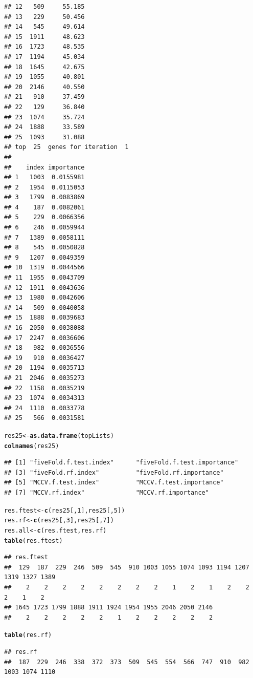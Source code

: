 \documentclass{article}\usepackage[]{graphicx}\usepackage[]{color}
\makeatletter
\newcommand{\hlnum}[1]{\textcolor[rgb]{0.686,0.059,0.569}{#1}}%
\newcommand{\hlstd}[1]{\textcolor[rgb]{0.345,0.345,0.345}{#1}}%
\newcommand{\hlkwb}[1]{\textcolor[rgb]{0.69,0.353,0.396}{#1}}%
\newcommand{\hlkwd}[1]{\textcolor[rgb]{0.737,0.353,0.396}{\textbf{#1}}}%
\newenvironment{kframe}{%
 \def\at@end@of@kframe{}%
 \ifinner\ifhmode%
  \def\at@end@of@kframe{\end{minipage}}%
  \begin{minipage}{\columnwidth}%
 \fi\fi%
 \def\FrameCommand##1{\hskip\@totalleftmargin \hskip-\fboxsep
 \colorbox{shadecolor}{##1}\hskip-\fboxsep
     \hskip-\linewidth \hskip-\@totalleftmargin \hskip\columnwidth}%
 \MakeFramed {\advance\hsize-\width
   \@totalleftmargin\z@ \linewidth\hsize
   \@setminipage}}%
 {\par\unskip\endMakeFramed%
 \at@end@of@kframe}
\newenvironment{knitrout}{}{} %
\makeatother
\begin{document}
\begin{knitrout}
\begin{kframe}
\begin{verbatim}
## 12   509     55.185
## 13   229     50.456
## 14   545     49.614
## 15  1911     48.623
## 16  1723     48.535
## 17  1194     45.034
## 18  1645     42.675
## 19  1055     40.801
## 20  2146     40.550
## 21   910     37.459
## 22   129     36.840
## 23  1074     35.724
## 24  1888     33.589
## 25  1093     31.088
## top  25  genes for iteration  1 
##  
##    index importance
## 1   1003  0.0155981
## 2   1954  0.0115053
## 3   1799  0.0083869
## 4    187  0.0082061
## 5    229  0.0066356
## 6    246  0.0059944
## 7   1389  0.0058111
## 8    545  0.0050828
## 9   1207  0.0049359
## 10  1319  0.0044566
## 11  1955  0.0043709
## 12  1911  0.0043636
## 13  1980  0.0042606
## 14   509  0.0040058
## 15  1888  0.0039683
## 16  2050  0.0038088
## 17  2247  0.0036606
## 18   982  0.0036556
## 19   910  0.0036427
## 20  1194  0.0035713
## 21  2046  0.0035273
## 22  1158  0.0035219
## 23  1074  0.0034313
## 24  1110  0.0033778
## 25   566  0.0031581
\end{verbatim}
\begin{alltt}
\hlstd{res25}\hlkwb{<-} \hlkwd{as.data.frame}\hlstd{(topLists)}
\hlkwd{colnames}\hlstd{(res25)}
\end{alltt}
\begin{verbatim}
## [1] "fiveFold.f.test.index"      "fiveFold.f.test.importance"
## [3] "fiveFold.rf.index"          "fiveFold.rf.importance"    
## [5] "MCCV.f.test.index"          "MCCV.f.test.importance"    
## [7] "MCCV.rf.index"              "MCCV.rf.importance"
\end{verbatim}
\begin{alltt}
\hlstd{res.ftest} \hlkwb{<-} \hlkwd{c}\hlstd{(res25[,}\hlnum{1}\hlstd{], res25[,}\hlnum{5}\hlstd{])}
\hlstd{res.rf} \hlkwb{<-}  \hlkwd{c}\hlstd{(res25[,}\hlnum{3}\hlstd{], res25[,}\hlnum{7}\hlstd{])}
\hlstd{res.all} \hlkwb{<-} \hlkwd{c}\hlstd{(res.ftest, res.rf)}
\hlkwd{table}\hlstd{(res.ftest)}
\end{alltt}
\begin{verbatim}
## res.ftest
##  129  187  229  246  509  545  910 1003 1055 1074 1093 1194 1207 1319 1327 1389 
##    2    2    2    2    2    2    2    2    1    2    1    2    2    2    1    2 
## 1645 1723 1799 1888 1911 1924 1954 1955 2046 2050 2146 
##    2    2    2    2    2    1    2    2    2    2    2
\end{verbatim}
\begin{alltt}
\hlkwd{table}\hlstd{(res.rf)}
\end{alltt}
\begin{verbatim}
## res.rf
##  187  229  246  338  372  373  509  545  554  566  747  910  982 1003 1074 1110 

\end{verbatim}
\end{kframe}
\end{knitrout}
\end{document}

